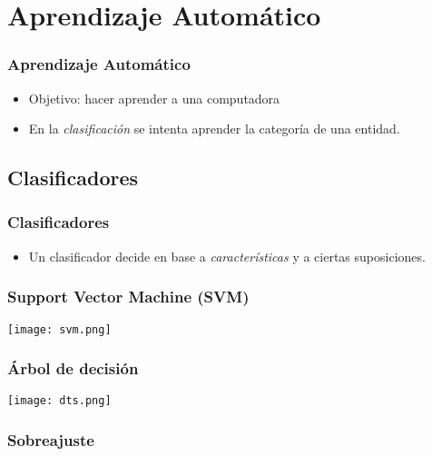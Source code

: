 \section{Aprendizaje Automático}

\begin{frame}
    \frametitle{Aprendizaje Automático}

    \begin{itemize}
        \item Objetivo: hacer aprender a una computadora
        \item En la \emph{clasificación} se intenta aprender la categoría de una entidad.
    \end{itemize}
\end{frame}

\subsection{Clasificadores}
\begin{frame}
    \frametitle{Clasificadores}
    
    \begin{itemize}
        \item Un clasificador decide en base a \emph{características} y a ciertas suposiciones.
    \end{itemize}
\end{frame}

\begin{frame}
    \frametitle{Support Vector Machine (SVM)}

    \begin{center}
        \texttt{[image: svm.png]}
    \end{center}
\end{frame}

\begin{frame}
    \frametitle{Árbol de decisión}

    \begin{center}
        \texttt{[image: dts.png]}
    \end{center}
\end{frame}

\begin{frame}
    \frametitle{Sobreajuste}

    \begin{center}
        
    \end{center}
\end{frame}

